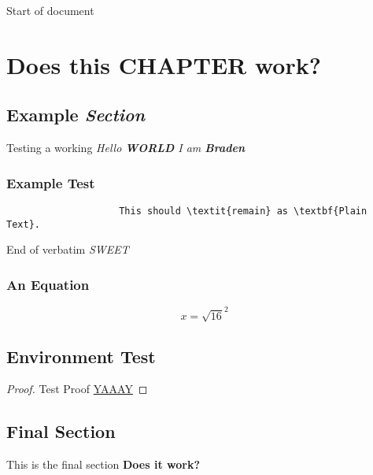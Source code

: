 \documentclass{camel}
\begin{document}
	Start of document
	\chapter{Does this \textbf{CHAPTER} work?}
		\section{Example \textit{Section}}
			Testing a working \textit{Hello \textbf{WORLD} I am \textbf{Braden}}

			\subsection{Example Test}
				\begin{verbatim}
					This should \textit{remain} as \textbf{Plain Text}.
				\end{verbatim}
				End of verbatim \textit{SWEET}

			\subsection{An Equation}
				\begin{equation}
					x = \sqrt{16}^2
				\end{equation}
		\section{Environment Test}
			\begin{proof}
				Test Proof \underline{YAAAY}
			\end{proof}
		\section{Final Section}
			This is the final section \textbf{Does it work?}
\end{document}
